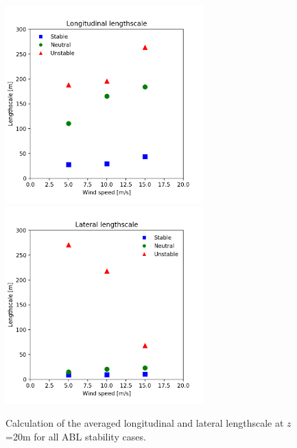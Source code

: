\begin{figure}[hbt!]
  \centering
  \includegraphics[width=3in]{figures/AllStability_Rij_LongitudinalLengthscale.png}
  \includegraphics[width=3in]{figures/AllStability_Rij_LateralLengthscale.png}
  \caption{ \label{fig:AllStabilityLengthscale} Calculation of the
    averaged longitudinal and lateral lengthscale at $z$=20m for all
    ABL stability cases.}
\end{figure}

